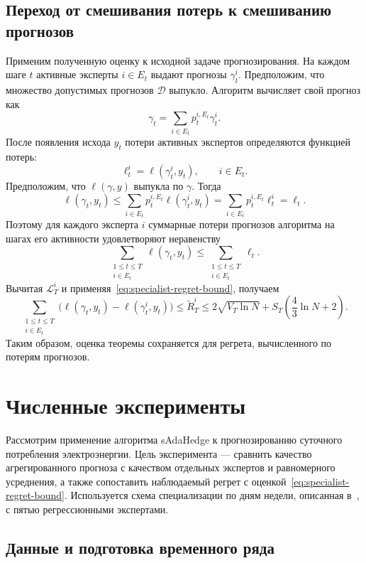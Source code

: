 \documentclass[a4paper,12pt]{article}
\theoremstyle{plain}
\theoremstyle{definition}
\theoremstyle{remark}
\numberwithin{equation}{section}
\begin{document}
\subsection{Переход от смешивания потерь к смешиванию прогнозов}

Применим полученную оценку к исходной задаче прогнозирования. На каждом шаге $t$ активные эксперты $i\in E_t$ выдают прогнозы $\gamma_t^i$. Предположим, что множество допустимых прогнозов $\mathcal{D}$ выпукло. Алгоритм вычисляет свой прогноз как
\[
\gamma_t=\sum_{i\in E_t}p_t^{i,E_t}\gamma_t^i.
\]
После появления исхода $y_t$ потери активных экспертов определяются функцией потерь:
\[
\ell_t^i=\ell(\gamma_t^i,y_t),\qquad i\in E_t.
\]
Предположим, что $\ell(\gamma,y)$ выпукла по $\gamma$. Тогда
\[
\ell(\gamma_t,y_t)
\leqslant\sum_{i\in E_t}p_t^{i,E_t}\ell(\gamma_t^i,y_t)
=\sum_{i\in E_t}p_t^{i,E_t}\ell_t^i
=\ell_t.
\]
Поэтому для каждого эксперта $i$ суммарные потери прогнозов алгоритма на шагах его активности удовлетворяют неравенству
\[
\sum_{\substack{1\leqslant t\leqslant T\\i\in E_t}}\ell(\gamma_t,y_t)
\leqslant\sum_{\substack{1\leqslant t\leqslant T\\i\in E_t}}\ell_t.
\]
Вычитая $\mathcal{L}_T^i$ и применяя~\eqref{eq:specialist-regret-bound}, получаем
\[
\sum_{\substack{1\leqslant t\leqslant T\\i\in E_t}}
\bigl(\ell(\gamma_t,y_t)-\ell(\gamma_t^i,y_t)\bigr)
\leqslant\widetilde R_T^i
\leqslant2\sqrt{V_T\ln N}
 +S_T\left(\frac43\ln N+2\right).
\]
Таким образом, оценка теоремы сохраняется для регрета, вычисленного по потерям прогнозов.

\section{Численные эксперименты}
\label{sec:experiments}

Рассмотрим применение алгоритма sAdaHedge к прогнозированию суточного потребления электроэнергии. Цель эксперимента --- сравнить качество агрегированного прогноза с качеством отдельных экспертов и равномерного усреднения, а также сопоставить наблюдаемый регрет с оценкой~\eqref{eq:specialist-regret-bound}. Используется схема специализации по дням недели, описанная в~\cite{VyuginSham}, с пятью регрессионными экспертами.

\subsection{Данные и подготовка временного ряда}
\end{document}
